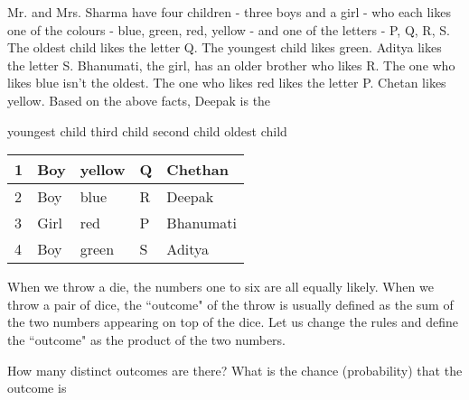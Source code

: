 \documentclass[12pt,answers]{exam}
\begin{document}
\begin{questions}
\question Mr. and Mrs. Sharma have four children - three boys and a girl - who each likes one of the colours - blue, green, red, yellow - and one of the letters - P, Q, R, S. The oldest child likes the letter Q. The youngest child likes green. Aditya likes the letter S. Bhanumati, the girl, has an older brother who likes R. The one who likes blue isn't the oldest. The one who likes red likes the letter P. Chetan likes yellow. Based on the above facts, Deepak is the
\begin{choices}
    \choice youngest child
    \choice third child
    \choice second child
    \choice oldest child
\end{choices}
\begin{solution}
    \begin{tabular}{lllll}
        \hline
        1 & Boy	&	yellow	&	Q	&	Chethan	\\\hline
        2 & Boy	&	blue	&	R	&	Deepak	\\\hline
        3 & Girl	&	red	&	P	&	Bhanumati	\\\hline
        4 & Boy	&	green	&	S	&	Aditya	\\\hline
      \end{tabular}
\end{solution}
\question When we throw a die, the numbers one to six are all equally likely. When we throw a pair of dice, the ``outcome" of the throw is usually defined as the sum of the two numbers appearing on top of the dice. Let us change the rules and define the ``outcome" as the product of the two numbers.

How many distinct outcomes are there? What is the chance (probability) that the outcome is

\end{questions}
\end{document}
